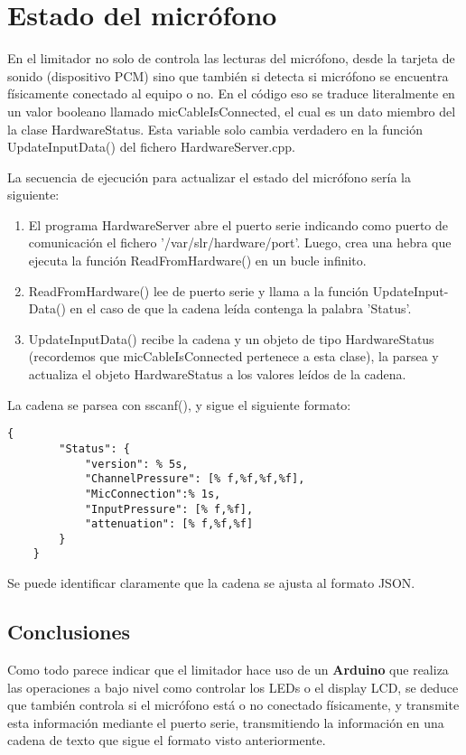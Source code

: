 \documentclass[]{article}
\begin{document}
\section{Estado del micrófono}
En el limitador no solo de controla las lecturas del micrófono, desde la tarjeta de sonido (dispositivo PCM) sino que también si detecta si micrófono se encuentra físicamente conectado al equipo o no. En el código eso se traduce literalmente en un valor booleano llamado micCableIsConnected, el cual es un dato miembro del la clase HardwareStatus. Esta variable solo cambia verdadero en la función UpdateInputData() del fichero HardwareServer.cpp.

La secuencia de ejecución para actualizar el estado del micrófono sería la siguiente:

\begin{enumerate}
	\item El programa HardwareServer abre el puerto serie indicando como puerto de comunicación el fichero '/var/slr/hardware/port'. Luego, crea una hebra que ejecuta la función ReadFromHardware() en un bucle infinito.
	\item ReadFromHardware() lee de puerto serie y llama a la función UpdateInput-Data() en el caso de que la cadena leída contenga la palabra 'Status'.
	\item UpdateInputData() recibe la cadena y un objeto de tipo HardwareStatus (recordemos que micCableIsConnected pertenece a esta clase), la parsea y actualiza el objeto HardwareStatus a los valores leídos de la cadena.
\end{enumerate}

La cadena se parsea con sscanf(), y sigue el siguiente formato:

\begin{lstlisting}[caption=Formato de la cadena leída desde el puerto serie]
	{
		"Status": {
			"version": % 5s,
			"ChannelPressure": [% f,%f,%f,%f],
			"MicConnection":% 1s,
			"InputPressure": [% f,%f],
			"attenuation": [% f,%f,%f]
		}
	}
\end{lstlisting}

Se puede identificar claramente que la cadena se ajusta al formato JSON.

\subsection{Conclusiones}
Como todo parece indicar que el limitador hace uso de un \textbf{Arduino} que realiza las operaciones a bajo nivel como controlar los LEDs o el display LCD, se deduce que también controla si el micrófono está o no conectado físicamente, y transmite esta información mediante el puerto serie, transmitiendo la información en una cadena de texto que sigue el formato visto anteriormente.
\end{document}
